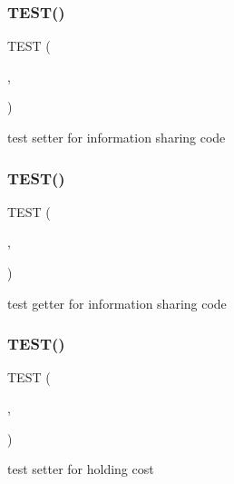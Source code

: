 \subsubsection{\texorpdfstring{T\+E\+S\+T()}{TEST()}\hspace{0.1cm}{\footnotesize\ttfamily [22/54]}}
{\footnotesize\ttfamily T\+E\+ST (\begin{DoxyParamCaption}\item[{game\+Test}]{,  }\item[{set\+Info\+Code\+Test}]{ }\end{DoxyParamCaption})}

test setter for information sharing code \mbox{\label{group__group2_ga9a536a7dc3135427bf7078aa0fa6ff7a}} 
\subsubsection{\texorpdfstring{T\+E\+S\+T()}{TEST()}\hspace{0.1cm}{\footnotesize\ttfamily [23/54]}}
{\footnotesize\ttfamily T\+E\+ST (\begin{DoxyParamCaption}\item[{game\+Test}]{,  }\item[{get\+Info\+Code\+Test}]{ }\end{DoxyParamCaption})}

test getter for information sharing code \mbox{\label{group__group2_gafe1ed549d507505dff2e98804caa967d}} 
\subsubsection{\texorpdfstring{T\+E\+S\+T()}{TEST()}\hspace{0.1cm}{\footnotesize\ttfamily [24/54]}}
{\footnotesize\ttfamily T\+E\+ST (\begin{DoxyParamCaption}\item[{game\+Test}]{,  }\item[{set\+Holding\+Cost\+Test}]{ }\end{DoxyParamCaption})}

test setter for holding cost \mbox{\label{group__group2_gaf283280f1bedb6c7cf2dd66b6cd0f8ca}} 
